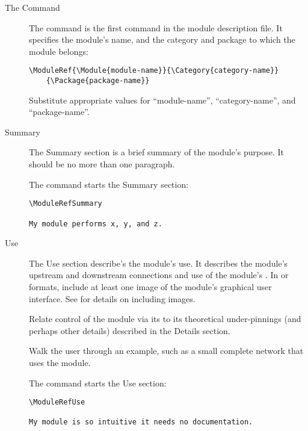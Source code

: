 \documentclass[11pt]{article}
\begin{document}
\begin{description}
\item[The  Command]\mbox{}
  
  The  command is the first command in the
  module description file.  It specifies the module's
  name, and the category and package to which the module belongs:

\begin{verbatim}
\ModuleRef{\Module{module-name}}{\Category{category-name}}
    {\Package{package-name}}
\end{verbatim}
  
  Substitute appropriate values for ``module-name'',
  ``category-name'', and ``package-name''.

\item[Summary]
  \label{sec:summary} \mbox{}

  The Summary section is a brief summary of the module's purpose.  It
  should be no more than one paragraph.

  The  command starts the Summary section:

\begin{verbatim}
\ModuleRefSummary

My module performs x, y, and z.     
\end{verbatim}

\item[Use] \label{sec:use} \mbox{}
  
  The Use section describe's the module's use.  It describes the
  module's upstream and downstream connections and use of the module's
  \gui{}.  In  or   formats, include at least one image  of the module's graphical user interface.  See  for details on
  including images.
  
  Relate control of the module via its \gui{} to its theoretical
  under-pinnings (and perhaps other details) described in the
  Details section.
  
  Walk the user through an example, such as a small
  complete network that uses the module.

  The  command starts the Use section:
  
\begin{verbatim}
\ModuleRefUse

My module is so intuitive it needs no documentation.
\end{verbatim}


\end{description}
\end{document}
